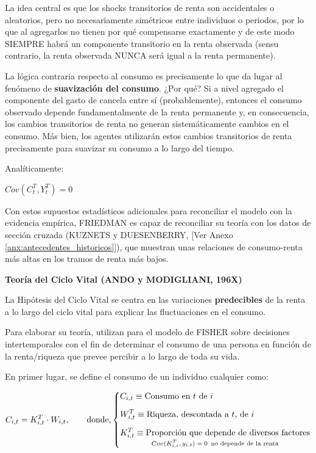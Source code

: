 \documentclass[10pt,a4paper]{article}
\newcommand{\authorfont}[1]{{\fontfamily{EBGaramond-TLF}\selectfont #1}}
\begin{document}
La idea central es que los shocks transitorios de renta son accidentales o aleatorios, pero no necesariamente simétricos entre individuos o periodos, por lo que al agregarlos no tienen por qué compensarse exactamente y de este modo SIEMPRE habrá un componente transitorio en la renta observada (sensu contrario, la renta observada NUNCA será igual a la renta permanente).

La lógica contraria respecto al consumo es precisamente lo que da lugar al fenómeno de \textbf{suavización del consumo}. ¿Por qué? Si a nivel agregado el componente del gasto de cancela entre sí (probablemente), entonces el consumo observado depende fundamentalmente de la renta permanente y, en consecuencia, los cambios transitorios de renta no generan sistemáticamente cambios en el consumo. Más bien, los agentes utilizarán estos cambios transitorios de renta precisamente para suavizar su consumo a lo largo del tiempo.

Analíticamente:

$Cov(C_t^T,Y_t^T)=0$

Con estos supuestos estadísticos adicionales para reconciliar el modelo con la evidencia empírica,  FRIEDMAN es capaz de reconciliar su teoría con los datos de sección cruzada (KUZNETS y DUESENBERRY, [\authorfont{Ver Anexo \ref{anx:antecedentes_historicos}}]), que muestran unas relaciones de consumo-renta más altas en los tramos de renta más bajos. 


\textbf{Teoría del Ciclo Vital (ANDO y MODIGLIANI, 196X)}

La Hipótesis del Ciclo Vital se centra en las variaciones \textbf{predecibles} de la renta a lo largo del ciclo vital para explicar las fluctuaciones en el consumo.

Para elaborar su teoría, utilizan para el modelo de FISHER sobre decisiones intertemporales con el fin de determinar el consumo de una persona en función de la renta/riqueza que prevee percibir a lo largo de toda su vida. 

En primer lugar, se define el consumo de un individuo cualquier como:

$\begin{aligned}
  C_{i,t}=K_{i,t}^T\cdot W_{i,t},\qquad \text{donde,}
    \left\{\begin{aligned}
        &C_{i,t}\equiv \text{Consumo en $t$ de $i$}\\[0.5em]
        &W_{i,t}^T\equiv \text{Riqueza, descontada a $t$, de $i$}\\[0.5em]
        &\underset{\text{\scriptsize $Cov(K_{i,t}^T,y_{i,t})=0\,$ no depende de la renta}}{K_{i,t}^T\equiv \text{Proporción que depende de diversos factores}}
    \end{aligned}\right.
\end{aligned}$
\end{document}
